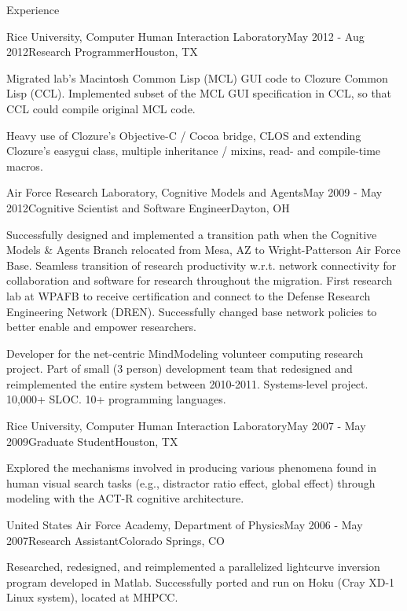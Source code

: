
\begin{rSection}{Experience}

\begin{rSubsection}{Rice University, Computer Human Interaction Laboratory}{May 2012 - Aug 2012}{Research Programmer}{Houston, TX}
\item Migrated lab's Macintosh Common Lisp (MCL) GUI code to Clozure Common Lisp (CCL).
  Implemented subset of the MCL GUI specification in CCL, so that CCL could compile original MCL code.
\item Heavy use of Clozure's Objective-C / Cocoa bridge, CLOS and extending Clozure's easygui class, multiple inheritance / mixins, read- and compile-time macros.
\end{rSubsection}

\begin{rSubsection}{Air Force Research Laboratory, Cognitive Models and Agents}{May 2009 - May 2012}{Cognitive Scientist and Software Engineer}{Dayton, OH}
\item Successfully designed and implemented a transition path when the Cognitive Models \& Agents Branch relocated from Mesa, AZ to Wright-Patterson Air Force Base. 
Seamless transition of research productivity w.r.t. network connectivity for collaboration and software for research throughout the migration.
First research lab at WPAFB to receive certification and connect to the Defense Research Engineering Network (DREN).
Successfully changed base network policies to better enable and empower researchers.
\item Developer for the net-centric MindModeling volunteer computing research project.
Part of small (3 person) development team that redesigned and reimplemented the entire system between 2010-2011.
Systems-level project. 10,000+ SLOC. 10+ programming languages.
\end{rSubsection}

\begin{rSubsection}{Rice University, Computer Human Interaction Laboratory}{May 2007 - May 2009}{Graduate Student}{Houston, TX}
\item Explored the mechanisms involved in producing various phenomena found in human visual search tasks
(e.g., distractor ratio effect, global effect) through modeling with the ACT-R cognitive architecture. 
\end{rSubsection}

\begin{rSubsection}{United States Air Force Academy, Department of Physics}{May 2006 - May 2007}{Research Assistant}{Colorado Springs, CO}
\item Researched, redesigned, and reimplemented a parallelized lightcurve inversion program developed in Matlab.
Successfully ported and run on Hoku (Cray XD-1 Linux system), located at MHPCC.
\end{rSubsection}


\end{rSection}
